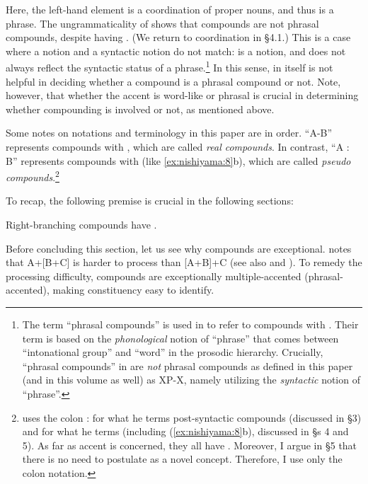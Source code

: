 \documentclass[output=paper]{LSP/langsci}
\begin{document}
Here, the left-hand element is a coordination of proper nouns, and thus is a phrase. The ungrammaticality of  shows that  compounds are not phrasal compounds, despite having . (We return to coordination in §4.1.) This is a case where a  notion and a syntactic notion do not match:  is a  notion, and does not always reflect the syntactic status of a phrase.\footnote{The term ``phrasal compounds'' is used in \citet{ItoMester2007} to refer to compounds with . Their term is based on the \textit{phonological} notion of “phrase” that comes between “intonational group” and ``word” in the prosodic hierarchy. Crucially, “phrasal compounds” in   \citet{ItoMester2007} are \textit{not} phrasal compounds as defined in this paper (and in this volume as well) as XP-X, namely utilizing the \textit{syntactic} notion of “phrase”.} In this sense,  in itself is not helpful in deciding whether a compound is a phrasal compound or not. Note, however, that whether the accent is word-like or phrasal is crucial in determining whether compounding is involved or not, as mentioned above.

Some notes on notations and terminology in this paper are in order. “A-B” represents compounds with , which are called \textit{real compounds}. In contrast, “A : B” represents compounds with  (like \ref{ex:nishiyama:8}b), which are called \textit{pseudo compounds}.\footnote{\citet{Kageyama1993,Kageyama2001,Kageyama2009} uses the colon : for what he terms post-syntactic compounds (discussed in §3) and {\textbar} for what he terms  (including (\ref{ex:nishiyama:8}b), discussed in §s 4 and 5). As far as accent is concerned, they all have . Moreover, I argue in §5 that there is no need to postulate  as a novel concept. Therefore, I use only the colon notation.}

  To recap, the following premise is crucial in the following sections:

\ea\label{ex:nishiyama:10}
 Right-branching compounds have .
\z

Before concluding this section, let us see why  compounds are exceptional. \citet[107]{Kubozono1995} notes that  A+[B+C] is harder to process than  [A+B]+C (see also \citealt{Hawkins1990} and \citealt{Sugioka2008}). To remedy the processing difficulty,  compounds are exceptionally multiple-accented (phrasal-accented), making constituency easy to identify.
\end{document}
